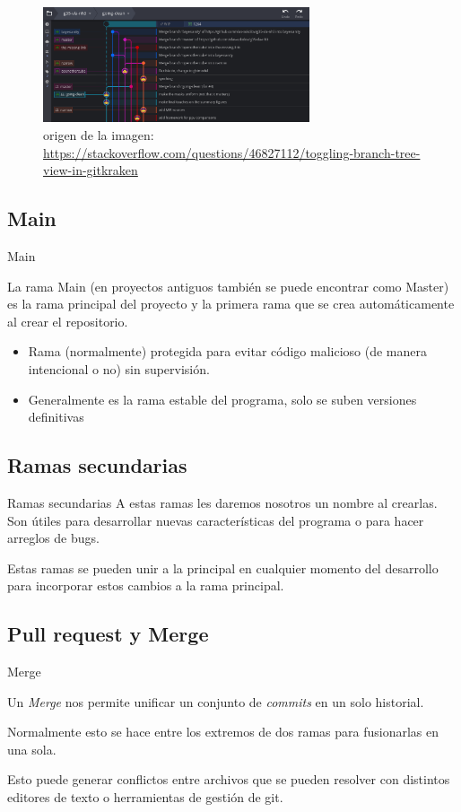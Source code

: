 \documentclass{beamer}
\begin{document}
\begin{frame}
    \begin{figure}[H]
        \includegraphics[width=0.7\textwidth]{../Images/ejemplo-ramas.png}
        \caption{origen de la imagen: \url{https://stackoverflow.com/questions/46827112/toggling-branch-tree-view-in-gitkraken}}
    \end{figure}
\end{frame}
\subsection{Main}
\begin{frame}{Main}

    La rama Main (en proyectos antiguos también se puede encontrar como Master) es la rama principal del proyecto y la primera rama que se crea automáticamente al crear el repositorio.

    \begin{itemize}
        \item Rama (normalmente) protegida para evitar código malicioso (de manera intencional o no) sin supervisión.
        \item Generalmente es la rama estable del programa, solo se suben versiones definitivas
    \end{itemize}

\end{frame}
\subsection{Ramas secundarias}
\begin{frame}{Ramas secundarias}
    A estas ramas les daremos nosotros un nombre al crearlas. Son útiles para desarrollar nuevas características del programa o para hacer arreglos de bugs.

    Estas ramas se pueden unir a la principal en cualquier momento del desarrollo para incorporar estos cambios a la rama principal.
\end{frame}
\subsection{Pull request y Merge}
\begin{frame}{Merge}

    Un \textit{Merge} nos permite unificar un conjunto de \textit{commits} en un solo historial.

    Normalmente esto se hace entre los extremos de dos ramas para fusionarlas en una sola.

    Esto puede generar conflictos entre archivos que se pueden resolver con distintos editores de texto o herramientas de gestión de git.

\end{frame}
\end{document}
